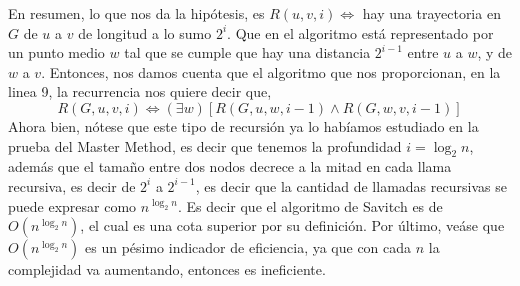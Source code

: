 \begin{problema}
\begin{sol}
        En resumen, lo que nos da la hipótesis, es $R(u,v,i)\iff$ hay una trayectoria en $G$ de $u$ a $v$ de longitud a lo sumo $2^i$. Que en el algoritmo está representado por un punto medio $w$ tal que se cumple que hay una distancia $2^{i-1}$ entre $u$ a $w$, y de $w$ a $v$. Entonces, nos damos cuenta que el algoritmo que nos proporcionan, en la linea 9, la recurrencia nos quiere decir que, 
        $$R(G,u,v,i)\iff (\exists w)[R(G,u,w,i-1)\wedge R(G,w,v,i-1)]$$
        Ahora bien, nótese que este tipo de recursión ya lo habíamos estudiado en la prueba del Master Method, es decir que tenemos la profundidad $i=\log_2 n$, además que el tamaño entre dos nodos decrece a la mitad en cada llama recursiva, es decir de $2^i$ a $2^{i-1}$, es decir que la cantidad de llamadas recursivas se puede expresar como $n^{\log_2 n}$. Es decir que el algoritmo de Savitch es de $O(n^{\log_2 n})$, el cual es una cota superior por su definición. Por último, veáse que $O(n^{\log_2 n})$ es un pésimo indicador de eficiencia, ya que con cada $n$ la complejidad va aumentando, entonces es ineficiente. 
    \end{sol}
        
\end{problema}

%
%

